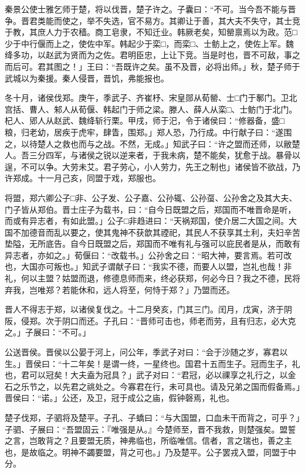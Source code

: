 \documentclass[]{article}
\begin{document}
秦景公使士雅乞师于楚，将以伐晋，楚子许之。子囊曰：``不可。当今吾不能与晋争。晋君类能而使之，举不失选，官不易方。其卿让于善，其大夫不失守，其士竞于教，其庶人力于农穑。商工皂隶，不知迁业。韩厥老矣，知罃禀焉以为政。范□少于中行偃而上之，使佐中军。韩起少于栾□，而栾□、士鲂上之，使佐上军。魏绛多功，以赵武为贤而为之佐。君明臣忠，上让下竞。当是时也，晋不可敌，事之而后可。君其图之！」王曰：``吾既许之矣。虽不及晋，必将出师。」秋，楚子师于武城以为秦援。秦人侵晋，晋饥，弗能报也。

冬十月，诸侯伐郑。庚午，季武子、齐崔杼、宋皇郧从荀罃、士□门于鄟门。卫北宫括、曹人、邾人从荀偃、韩起门于师之梁。滕人、薛人从栾□、士鲂门于北门。杞人、郳人从赵武、魏绛斩行栗。甲戌，师于汜，令于诸侯曰：``修器备，盛□粮，归老幼，居疾于虎牢，肆眚，围郑。」郑人恐，乃行成。中行献子曰：``遂围之，以待楚人之救也而与之战。不然，无成。」知武子曰：``许之盟而还师，以敝楚人。吾三分四军，与诸侯之锐以逆来者，于我未病，楚不能矣，犹愈于战。暴骨以逞，不可以争。大劳未艾。君子劳心，小人劳力，先王之制也」诸侯皆不欲战，乃许郑成。十一月己亥，同盟于戏，郑服也。

将盟，郑六卿公子□非、公子发、公子嘉、公孙辄、公孙虿、公孙舍之及其大夫、门子皆从郑伯。晋士庄子为载书，曰：``自今日既盟之后，郑国而不唯晋命是听，而或有异志者，有如此盟。」公子□非趋进曰：``天祸郑国，使介居二大国之间。大国不加德音而乱以要之，使其鬼神不获歆其禋祀，其民人不获享其土利，夫妇辛苦垫隘，无所底告。自今日既盟之后，郑国而不唯有礼与强可以庇民者是从，而敢有异志者，亦如之。」荀偃曰：``改载书。」公孙舍之曰：``昭大神，要言焉。若可改也，大国亦可叛也。」知武子谓献子曰：``我实不德，而要人以盟，岂礼也哉！非礼，何以主盟？姑盟而退，修德息师而来，终必获郑，何必今日？我之不德，民将弃我，岂唯郑？若能休和，远人将至，何恃于郑？」乃盟而还。

晋人不得志于郑，以诸侯复伐之。十二月癸亥，门其三门。闰月，戊寅，济于阴阪，侵郑。次于阴口而还。子孔曰：``晋师可击也，师老而劳，且有归志，必大克之。」子展曰：``不可。」

公送晋侯。晋侯以公晏于河上，问公年，季武子对曰：``会于沙随之岁，寡君以生。」晋侯曰：``十二年矣！是谓一终，一星终也。国君十五而生子。冠而生子，礼也，君可以冠矣！大夫盍为冠具？」武子对曰：``君冠，必以祼享之礼行之，以金石之乐节之，以先君之祧处之。今寡君在行，未可具也。请及兄弟之国而假备焉。」晋侯曰：``诺。」公还，及卫，冠于成公之庙，假钟磬焉，礼也。

楚子伐郑，子驷将及楚平。子孔、子蟜曰：``与大国盟，口血未干而背之，可乎？」子驷、子展曰：``吾盟固云：『唯强是从。』今楚师至，晋不我救，则楚强矣。盟誓之言，岂敢背之？且要盟无质，神弗临也，所临唯信。信者，言之瑞也，善之主也，是故临之。明神不蠲要盟，背之可也。」乃及楚平。公子罢戎入盟，同盟于中分。
\end{document}
